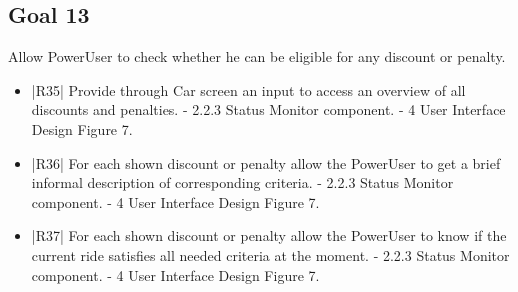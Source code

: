 \subsection {Goal 13} Allow PowerUser to check whether he can be eligible for any discount or penalty.
\begin{itemize}
 \item |R35| Provide through Car screen an input to access an overview of all discounts
and penalties.
    \newline - 2.2.3 Status Monitor component.
    \newline - 4 User Interface Design Figure 7.
 \item |R36| For each shown discount or penalty allow the PowerUser to get a brief informal description of corresponding criteria.
    \newline - 2.2.3 Status Monitor component.
    \newline - 4 User Interface Design Figure 7.
 \item |R37| For each shown discount or penalty allow the PowerUser to know if the current ride satisfies all needed criteria at the moment.
    \newline - 2.2.3 Status Monitor component.
    \newline - 4 User Interface Design Figure 7.
\end{itemize}

